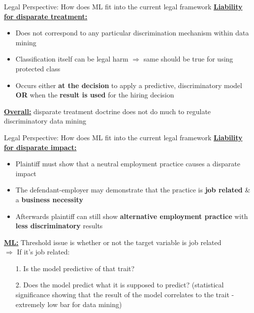 \begin{frame}{Legal Perspective: How does ML fit into the current legal framework \cite{Barocas.2016}}
\underline{\textbf{Liability for disparate treatment:}}\\

\begin{itemize}
    \item Does not correspond to any particular discrimination mechanism within data mining
    \item Classification itself can be legal harm $\Rightarrow$ same should be true for using protected class
    \item Occurs either \textbf{at the decision} to apply a predictive, discriminatory model \textbf{OR} when the \textbf{result is used} for the hiring decision
\end{itemize}
\vspace{1cm}
\underline{\textbf{Overall:}} disparate treatment doctrine does not do much to regulate discriminatory data mining
\end{frame}

\begin{frame}{Legal Perspective: How does ML fit into the current legal framework \cite{Barocas.2016}}
\underline{\textbf{Liability for disparate impact:}}\\

\begin{itemize}
    \item Plaintiff must show that a neutral employment practice causes a disparate impact
    \item The defendant-employer may demonstrate that the practice is \textbf{job related} \& a \textbf{business necessity}
    \item Afterwards plaintiff can still show \textbf{alternative employment practice} with \textbf{less discriminatory} results
\end{itemize}
\underline{\textbf{ML:}} Threshold issue is whether or not the target variable is job related\\
\vspace{0.5cm}
$\Rightarrow$ If it's job related: 
\begin{itemize}
    \item[1.] Is the model predictive of that trait?
    \item[2.] Does the model predict what it is supposed to predict? (statistical significance showing that the result of the model correlates to the trait - extremely low bar for data mining)
\end{itemize}
\end{frame}

